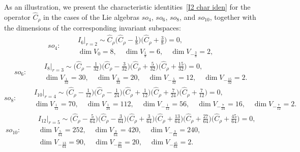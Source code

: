 \documentclass[a4paper]{article}
\newcommand{\hC}{\widehat{C}}
\renewcommand{\=}{\ =\ }
\numberwithin{equation}{section}
\theoremstyle{remark}
\begin{document}
As an illustration, we present the characteristic identities~\eqref{I2 char iden} for the operator $\hC_\rho$ in the cases of the Lie algebras $so_4$, $so_6$, $so_8$, and $so_{10}$, together with the dimensions of the corresponding invariant subspaces:
\begin{equation}
so_4:\qquad
\begin{gathered}
I_6|_{r=2}\sim\hC_\rho\Big(\hC_\rho-\frac{1}{8}\Big)\Big(\hC_\rho+\frac{3}{8}\Big)=0,\\ \dim V_0=8,\quad \dim V_{\frac{1}{8}}=6,\quad \dim V_{-\frac{3}{8}}=2,
\end{gathered}
\end{equation}
\begin{equation}
so_6:\qquad
\begin{gathered}
I_8|_{r=3}\sim\Big(\hC_\rho-\frac{1}{32}\Big)\Big(\hC_\rho-\frac{3}{32}\Big)\Big(\hC_\rho+\frac{5}{32}\Big)\Big(\hC_\rho+\frac{15}{32}\Big)=0,\\
\dim V_{\frac{1}{32}}=30,\quad \dim V_{\frac{3}{32}}=20,\quad \dim V_{-\frac{5}{32}}=12,\quad \dim V_{-\frac{15}{32}}=2.
\end{gathered}
\end{equation}
\begin{equation}
so_{8}:\qquad
\begin{gathered}
I_{10}|_{r=4}\sim \Big(\hC_\rho-\frac{1}{12}\Big)\Big(\hC_\rho-\frac{1}{24}\Big)\Big(\hC_\rho+\frac{1}{12}\Big)\Big(\hC_\rho+\frac{7}{24}\Big)\Big(\hC_\rho+\frac{7}{12}\Big)=0,\\
\dim V_{\frac{1}{12}}=70,\quad \dim V_{\frac{1}{24}}=112,\quad \dim V_{-\frac{1}{12}}=56,\quad \dim V_{-\frac{7}{24}}=16,\quad \dim V_{-\frac{7}{12}}=2.
\end{gathered}
\end{equation}
\begin{equation}
so_{10}:\qquad
\begin{gathered}
I_{12}|_{r=5}\sim \Big(\hC_\rho-\frac{5}{64}\Big)\Big(\hC_\rho-\frac{3}{64}\Big)\Big(\hC_\rho+\frac{3}{64}\Big)\Big(\hC_\rho+\frac{13}{64}\Big)\Big(\hC_\rho+\frac{27}{64}\Big)\Big(\hC_\rho+\frac{45}{64}\Big)=0,\\
\dim V_{\frac{5}{64}}=252,\quad \dim V_{\frac{3}{64}}=420,\quad \dim V_{-\frac{3}{64}}=240,\\
\dim V_{-\frac{13}{64}}=90,\quad \dim V_{-\frac{27}{64}}=20,\quad \dim V_{-\frac{45}{64}}=2.
\end{gathered}
\end{equation}
\end{document}
